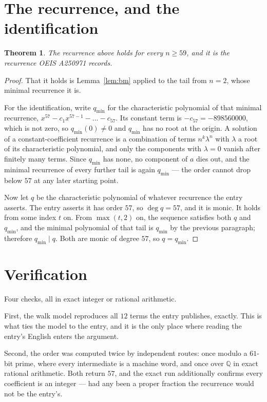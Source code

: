 \documentclass[11pt,a4paper]{article}
\theoremstyle{plain}
\newtheorem{theorem}{Theorem}
\theoremstyle{definition}
\begin{document}
\section{The recurrence, and the identification}

\begin{theorem}
The recurrence above holds for every $n\ge59$, and it is the recurrence OEIS A250971 records.
\end{theorem}

\begin{proof}
That it holds is Lemma~\ref{lem:bm} applied to the tail from $n=2$, whose minimal
recurrence it is.

For the identification, write $q_{\min}$ for the characteristic polynomial of that minimal
recurrence, $x^{57}-c_1x^{57-1}-\dots-c_{57}$. Its constant term is
$-c_{57}=-898560000$, which is not zero, so $q_{\min}(0)\neq0$ and $q_{\min}$ has no
root at the origin. A solution of a constant-coefficient recurrence is a combination of terms
$n^{k}\lambda^{n}$ with $\lambda$ a root of its characteristic polynomial, and only the
components with $\lambda=0$ vanish after finitely many terms. Since $q_{\min}$ has none, no
component of $a$ dies out, and the minimal recurrence of every further tail is again
$q_{\min}$ --- the order cannot drop below $57$ at any later starting point.

Now let $q$ be the characteristic polynomial of whatever recurrence the entry asserts. The
entry asserts it has order $57$, so $\deg q=57$, and it is monic. It holds from some
index $t$ on. From $\max(t,2)$ on, the sequence satisfies both $q$ and $q_{\min}$, and
the minimal polynomial of that tail is $q_{\min}$ by the previous paragraph; therefore
$q_{\min}\mid q$. Both are monic of degree $57$, so $q=q_{\min}$.
\end{proof}

\section{Verification}

Four checks, all in exact integer or rational arithmetic.

First, the walk model reproduces all $12$ terms the entry publishes, exactly. This is
what ties the model to the entry, and it is the only place where reading the entry's English
enters the argument.

Second, the order was computed twice by independent routes: once modulo a $61$-bit prime, where
every intermediate is a machine word, and once over $\mathbb{Q}$ in exact rational arithmetic.
Both return $57$, and the exact run additionally confirms every coefficient is an integer
--- had any been a proper fraction the recurrence would not be the entry's.
\end{document}
